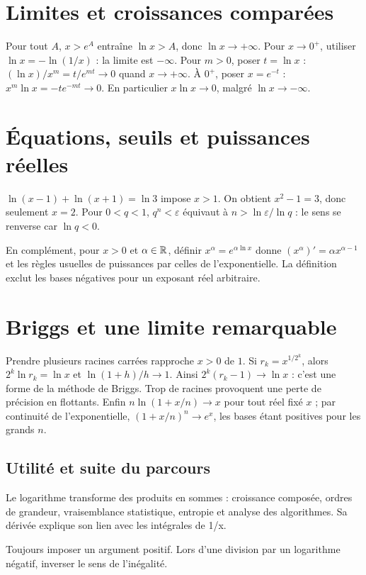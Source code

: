 \documentclass[../cours_tle.tex]{subfiles}
\begin{document}
\section{Limites et croissances comparées}
Pour tout $A$, $x>e^A$ entraîne $\ln x>A$, donc $\ln x\to+\infty$.
Pour $x\to0^+$, utiliser $\ln x=-\ln(1/x)$ : la limite est $-\infty$.
Pour $m>0$, poser $t=\ln x$ : $(\ln x)/x^m=t/e^{mt}\to0$ quand $x\to+\infty$.
À $0^+$, poser $x=e^{-t}$ : $x^m\ln x=-te^{-mt}\to0$. En particulier $x\ln x\to0$, malgré $\ln x\to-\infty$.
\section{Équations, seuils et puissances réelles}
$\ln(x-1)+\ln(x+1)=\ln3$ impose $x>1$. On obtient $x^2-1=3$, donc seulement $x=2$.
Pour $0<q<1$, $q^n<\varepsilon$ équivaut à $n>\ln\varepsilon/\ln q$ : le sens se renverse car $\ln q<0$.

En complément, pour $x>0$ et $\alpha\in\mathbb{R}$, définir $x^\alpha=e^{\alpha\ln x}$ donne
$(x^\alpha)'=\alpha x^{\alpha-1}$ et les règles usuelles de puissances par celles de l'exponentielle.
La définition exclut les bases négatives pour un exposant réel arbitraire.
\section{Briggs et une limite remarquable}
Prendre plusieurs racines carrées rapproche $x>0$ de $1$. Si $r_k=x^{1/2^k}$, alors
$2^k\ln r_k=\ln x$ et $\ln(1+h)/h\to1$.
Ainsi $2^k(r_k-1)\to\ln x$ : c'est une forme de la méthode de Briggs. Trop de racines provoquent une perte de précision en flottants.
Enfin $n\ln(1+x/n)\to x$ pour tout réel fixé $x$ ; par continuité de l'exponentielle, $(1+x/n)^n\to e^x$, les bases étant positives pour les grands $n$.
\begin{finchapitre}
\section{Utilité et suite du parcours}
Le logarithme transforme des produits en sommes : croissance composée, ordres de grandeur, vraisemblance statistique, entropie et analyse des algorithmes. Sa dérivée explique son lien avec les intégrales de 1/x.
\begin{retenir}
Toujours imposer un argument positif. Lors d'une division par un logarithme négatif, inverser le sens de l'inégalité.
\end{retenir}
\end{finchapitre}
\end{document}
